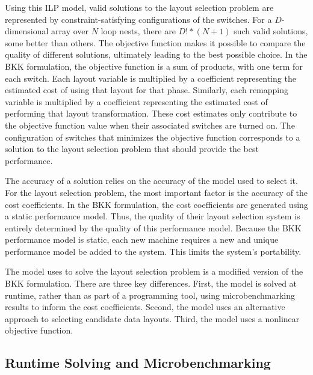 Using this ILP model, valid solutions to the layout selection problem are represented by constraint-satisfying configurations of the switches.
For a $D$-dimensional array over $N$ loop nests, there are $D!*(N+1)$ such valid solutions, some better than others.
The objective function makes it possible to compare the quality of different solutions, ultimately leading to the best possible choice.
In the BKK formulation, the objective function is a sum of products, with one term for each switch.
Each layout variable is multiplied by a coefficient representing the estimated cost of using that layout for that phase.
Similarly, each remapping variable is multiplied by a coefficient representing the estimated cost of performing that layout transformation.
These cost estimates only contribute to the objective function value when their associated switches are turned on.
The configuration of switches that minimizes the objective function corresponds to a solution to the layout selection problem that should provide the best performance.

The accuracy of a solution relies on the accuracy of the model used to select it.
For the layout selection problem, the most important factor is the accuracy of the cost coefficients.
In the BKK formulation, the cost coefficients are generated using a static performance model.
Thus, the quality of their layout selection system is entirely determined by the quality of this performance model.
Because the BKK performance model is static, each new machine requires a new and unique performance model be added to the system.
This limits the system's portability.




The model \FormatDecisions{} uses to solve the layout selection problem is a modified version of the BKK formulation.
There are three key differences.
First, the model is solved at runtime, rather than as part of a programming tool, using microbenchmarking results to inform the cost coefficients.
Second, the model uses an alternative approach to selecting candidate data layouts.
Third, the model uses a nonlinear objective function.



\subsection{Runtime Solving and Microbenchmarking}

